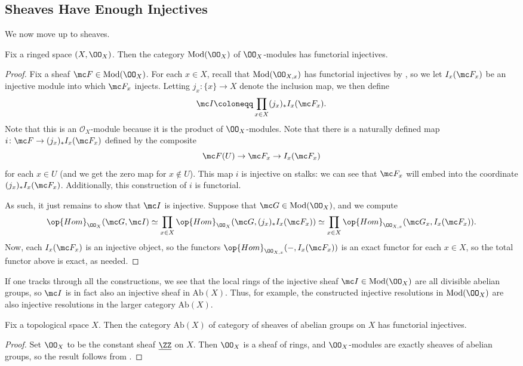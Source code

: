 \documentclass[../notes.tex]{subfiles}
\begin{document}
\subsection{Sheaves Have Enough Injectives}
We now move up to sheaves.
\begin{theorem} \label{thm:mod-ox-inj}
	Fix a ringed space $(X,\OO_X)$. Then the category $\mathrm{Mod}(\OO_X)$ of $\OO_X$-modules has functorial injectives.
\end{theorem}
\begin{proof}
	Fix a sheaf $\mc F\in\mathrm{Mod}(\OO_X)$. For each $x\in X$, recall that $\mathrm{Mod}(\OO_{X,x})$ has functorial injectives by , so we let $I_x(\mc F_x)$ be an injective module into which $\mc F_x$ injects. Letting $j_x\colon\{x\}\to X$ denote the inclusion map, we then define
	\[\mc I\coloneqq\prod_{x\in X}(j_x)_*I_x(\mc F_x).\]
	Note that this is an $\mathcal O_X$-module because it is the product of $\OO_X$-modules. Note that there is a naturally defined map $i\colon\mc F\to(j_x)_*I_x(\mc F_x)$ defined by the composite
	\[\mc F(U)\to\mc F_x\to I_x(\mc F_x)\]
	for each $x\in U$ (and we get the zero map for $x\notin U$). This map $i$ is injective on stalks: we can see that $\mc F_x$ will embed into the coordinate $(j_x)_*I_x(\mc F_x)$. Additionally, this construction of $i$ is functorial.

	As such, it just remains to show that $\mc I$ is injective. Suppose that $\mc G\in\mathrm{Mod}(\OO_X)$, and we compute
	\[\op{Hom}_{\OO_X}(\mc G,\mc I)\simeq\prod_{x\in X}\op{Hom}_{\OO_X}(\mc G,(j_x)_*I_x(\mc F_x))\simeq\prod_{x\in X}\op{Hom}_{\OO_{X,x}}(\mc G_x,I_x(\mc F_x)).\]
	Now, each $I_x(\mc F_x)$ is an injective object, so the functors $\op{Hom}_{\OO_{X,x}}(-,I_x(\mc F_x))$ is an exact functor for each $x\in X$, so the total functor above is exact, as needed.
\end{proof}
\begin{remark}
	If one tracks through all the constructions, we see that the local rings of the injective sheaf $\mc I\in\mathrm{Mod}(\OO_X)$ are all divisible abelian groups, so $\mc I$ is in fact also an injective sheaf in $\mathrm{Ab}(X)$. Thus, for example, the constructed injective resolutions in $\mathrm{Mod}(\OO_X)$ are also injective resolutions in the larger category $\mathrm{Ab}(X)$.
\end{remark}
\begin{corollary} \label{cor:ab-x-enough-inj}
	Fix a topological space $X$. Then the category $\mathrm{Ab}(X)$ of category of sheaves of abelian groups on $X$ has functorial injectives.
\end{corollary}
\begin{proof}
	Set $\OO_X$ to be the constant sheaf $\underline{\ZZ}$ on $X$. Then $\OO_X$ is a sheaf of rings, and $\OO_X$-modules are exactly sheaves of abelian groups, so the result follows from .
\end{proof}
\end{document}
